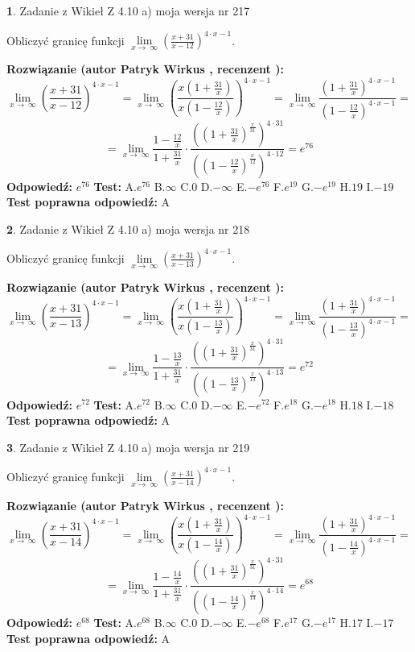 \documentclass[12pt, a4paper]{article}
\theoremstyle{definition} %
\newtheorem{zad}{}
\newcommand{\zadStart}[1]{\begin{zad}#1\newline}
\newcommand{\zadStop}{\end{zad}}
\newcommand{\rozwStart}[2]{\noindent \textbf{Rozwiązanie (autor #1 , recenzent #2): }\newline}
\newcommand{\rozwStop}{\newline}
\newcommand{\odpStart}{\noindent \textbf{Odpowiedź:}\newline}
\newcommand{\odpStop}{\newline}
\newcommand{\testStart}{\noindent \textbf{Test:}\newline}
\newcommand{\testStop}{\newline}
\newcommand{\kluczStart}{\noindent \textbf{Test poprawna odpowiedź:}\newline}
\newcommand{\kluczStop}{\newline}
\begin{document}
\zadStart{Zadanie z Wikieł Z 4.10 a) moja wersja nr 217}

Obliczyć granicę funkcji  $\lim\limits_{x\to\ \infty}(\frac{x+31}{x-12})^{4\cdot x-1}$.
\zadStop
\rozwStart{Patryk Wirkus}{}
$$\lim\limits_{x\to\ \infty}(\frac{x+31}{x-12})^{4\cdot x-1} = \lim\limits_{x\to\ \infty}(\frac{x(1+\frac{31}{x})}{x(1-\frac{12}{x})})^{4\cdot x-1}=\lim\limits_{x\to\ \infty}\frac{(1+\frac{31}{x})^{4\cdot x-1}}{(1-\frac{12}{x})^{4\cdot x-1}}=$$
$$=\lim\limits_{x\to\ \infty}\frac{1-\frac{12}{x}}{1+\frac{31}{x}}\cdot\frac{((1+\frac{31}{x})^{\frac{x}{31}})^{4\cdot31}}{((1-\frac{12}{x})^{\frac{x}{12}})^{4\cdot12}}=e^{76}$$
\rozwStop
\odpStart
$e^{76}$
\odpStop
\testStart
A.$e^{76}$ B.$\infty$ C.$0$ D.$-\infty$ E.$-e^{76}$
F.$e^{19}$ G.$-e^{19}$
H.$19$
I.$-19$
\testStop
\kluczStart
A
\kluczStop



\zadStart{Zadanie z Wikieł Z 4.10 a) moja wersja nr 218}

Obliczyć granicę funkcji  $\lim\limits_{x\to\ \infty}(\frac{x+31}{x-13})^{4\cdot x-1}$.
\zadStop
\rozwStart{Patryk Wirkus}{}
$$\lim\limits_{x\to\ \infty}(\frac{x+31}{x-13})^{4\cdot x-1} = \lim\limits_{x\to\ \infty}(\frac{x(1+\frac{31}{x})}{x(1-\frac{13}{x})})^{4\cdot x-1}=\lim\limits_{x\to\ \infty}\frac{(1+\frac{31}{x})^{4\cdot x-1}}{(1-\frac{13}{x})^{4\cdot x-1}}=$$
$$=\lim\limits_{x\to\ \infty}\frac{1-\frac{13}{x}}{1+\frac{31}{x}}\cdot\frac{((1+\frac{31}{x})^{\frac{x}{31}})^{4\cdot31}}{((1-\frac{13}{x})^{\frac{x}{13}})^{4\cdot13}}=e^{72}$$
\rozwStop
\odpStart
$e^{72}$
\odpStop
\testStart
A.$e^{72}$ B.$\infty$ C.$0$ D.$-\infty$ E.$-e^{72}$
F.$e^{18}$ G.$-e^{18}$
H.$18$
I.$-18$
\testStop
\kluczStart
A
\kluczStop



\zadStart{Zadanie z Wikieł Z 4.10 a) moja wersja nr 219}

Obliczyć granicę funkcji  $\lim\limits_{x\to\ \infty}(\frac{x+31}{x-14})^{4\cdot x-1}$.
\zadStop
\rozwStart{Patryk Wirkus}{}
$$\lim\limits_{x\to\ \infty}(\frac{x+31}{x-14})^{4\cdot x-1} = \lim\limits_{x\to\ \infty}(\frac{x(1+\frac{31}{x})}{x(1-\frac{14}{x})})^{4\cdot x-1}=\lim\limits_{x\to\ \infty}\frac{(1+\frac{31}{x})^{4\cdot x-1}}{(1-\frac{14}{x})^{4\cdot x-1}}=$$
$$=\lim\limits_{x\to\ \infty}\frac{1-\frac{14}{x}}{1+\frac{31}{x}}\cdot\frac{((1+\frac{31}{x})^{\frac{x}{31}})^{4\cdot31}}{((1-\frac{14}{x})^{\frac{x}{14}})^{4\cdot14}}=e^{68}$$
\rozwStop
\odpStart
$e^{68}$
\odpStop
\testStart
A.$e^{68}$ B.$\infty$ C.$0$ D.$-\infty$ E.$-e^{68}$
F.$e^{17}$ G.$-e^{17}$
H.$17$
I.$-17$
\testStop
\kluczStart
A
\kluczStop
\end{document}
